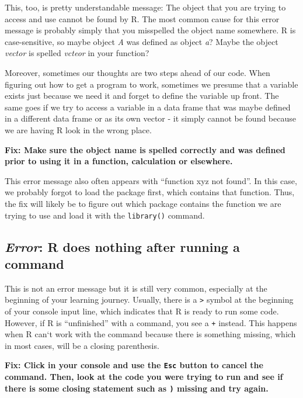 \documentclass[
]{book}
\begin{document}
This, too, is pretty understandable message:
The object that you are trying to access and use cannot be found by R.
The most common cause for this error message is probably simply that you misspelled the object name somewhere.
R is case-sensitive, so maybe object \emph{A} was defined as object \emph{a}?
Maybe the object \emph{vector} is spelled \emph{vcteor} in your function?

Moreover, sometimes our thoughts are two steps ahead of our code.
When figuring out how to get a program to work, sometimes we presume that a variable exists just because we need it and forget to define the variable up front.
The same goes if we try to access a variable in a data frame that was maybe defined in a different data frame or as its own vector - it simply cannot be found because we are having R look in the wrong place.

\textbf{Fix: Make sure the object name is spelled correctly and was defined prior to using it in a function, calculation or elsewhere.}

This error message also often appears with ``function xyz not found''.
In this case, we probably forgot to load the package first, which contains that function.
Thus, the fix will likely be to figure out which package contains the function we are trying to use and load it with the \texttt{library()} command.

\subsection*{\texorpdfstring{\emph{Error}: R does nothing after running a command}{Error: R does nothing after running a command}}\label{error-r-does-nothing-after-running-a-command}

This is not an error message but it is still very common, especially at the beginning of your learning journey.
Usually, there is a \texttt{\textgreater{}} symbol at the beginning of your console input line, which indicates that R is ready to run some code.
However, if R is ``unfinished'' with a command, you see a \texttt{+} instead.
This happens when R can`t work with the command because there is something missing, which in most cases, will be a closing parenthesis.

\textbf{Fix: Click in your console and use the \texttt{Esc} button to cancel the command. Then, look at the code you were trying to run and see if there is some closing statement such as \texttt{)} missing and try again.}
\end{document}
